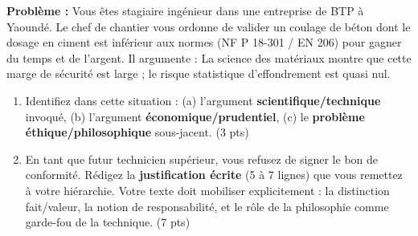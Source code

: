 \documentclass[11pt]{article}
\begin{document}
\begin{exercice}
\textbf{Problème :} Vous êtes stagiaire ingénieur dans une entreprise de BTP à Yaoundé. Le chef de chantier vous ordonne de valider un coulage de béton dont le dosage en ciment est inférieur aux normes (NF P 18-301 / EN 206) pour \og{}gagner du temps et de l'argent\fg{}. Il argumente : \og{}La science des matériaux montre que cette marge de sécurité est large ; le risque statistique d'effondrement est quasi nul.\fg{}

\begin{enumerate}
    \item Identifiez dans cette situation : (a) l'argument \textbf{scientifique/technique} invoqué, (b) l'argument \textbf{économique/prudentiel}, (c) le \textbf{problème éthique/philosophique} sous-jacent. (3 pts)
    \item En tant que futur technicien supérieur, vous refusez de signer le bon de conformité. Rédigez la \textbf{justification écrite} (5 à 7 lignes) que vous remettez à votre hiérarchie. Votre texte doit mobiliser explicitement : la distinction fait/valeur, la notion de responsabilité, et le rôle de la philosophie comme \og{}garde-fou\fg{} de la technique. (7 pts)
\end{enumerate}
\end{exercice}
\end{document}
